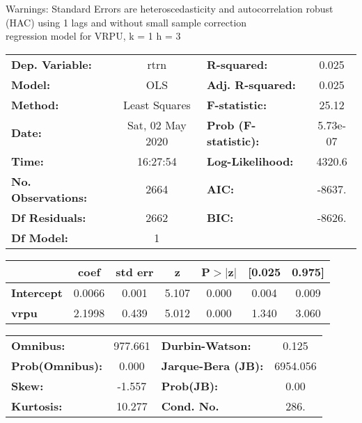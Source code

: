 Warnings: \newline
 [1] Standard Errors are heteroscedasticity and autocorrelation robust (HAC) using 1 lags and without small sample correction\\ 

regression model for VRPU, k = 1 h = 3\begin{center}
\begin{tabular}{lclc}
\toprule
\textbf{Dep. Variable:}    &       rtrn       & \textbf{  R-squared:         } &     0.025   \\
\textbf{Model:}            &       OLS        & \textbf{  Adj. R-squared:    } &     0.025   \\
\textbf{Method:}           &  Least Squares   & \textbf{  F-statistic:       } &     25.12   \\
\textbf{Date:}             & Sat, 02 May 2020 & \textbf{  Prob (F-statistic):} &  5.73e-07   \\
\textbf{Time:}             &     16:27:54     & \textbf{  Log-Likelihood:    } &    4320.6   \\
\textbf{No. Observations:} &        2664      & \textbf{  AIC:               } &    -8637.   \\
\textbf{Df Residuals:}     &        2662      & \textbf{  BIC:               } &    -8626.   \\
\textbf{Df Model:}         &           1      & \textbf{                     } &             \\
\bottomrule
\end{tabular}
\begin{tabular}{lcccccc}
                   & \textbf{coef} & \textbf{std err} & \textbf{z} & \textbf{P$> |$z$|$} & \textbf{[0.025} & \textbf{0.975]}  \\
\midrule
\textbf{Intercept} &       0.0066  &        0.001     &     5.107  &         0.000        &        0.004    &        0.009     \\
\textbf{vrpu}      &       2.1998  &        0.439     &     5.012  &         0.000        &        1.340    &        3.060     \\
\bottomrule
\end{tabular}
\begin{tabular}{lclc}
\textbf{Omnibus:}       & 977.661 & \textbf{  Durbin-Watson:     } &    0.125  \\
\textbf{Prob(Omnibus):} &   0.000 & \textbf{  Jarque-Bera (JB):  } & 6954.056  \\
\textbf{Skew:}          &  -1.557 & \textbf{  Prob(JB):          } &     0.00  \\
\textbf{Kurtosis:}      &  10.277 & \textbf{  Cond. No.          } &     286.  \\
\bottomrule
\end{tabular}
\end{center}

